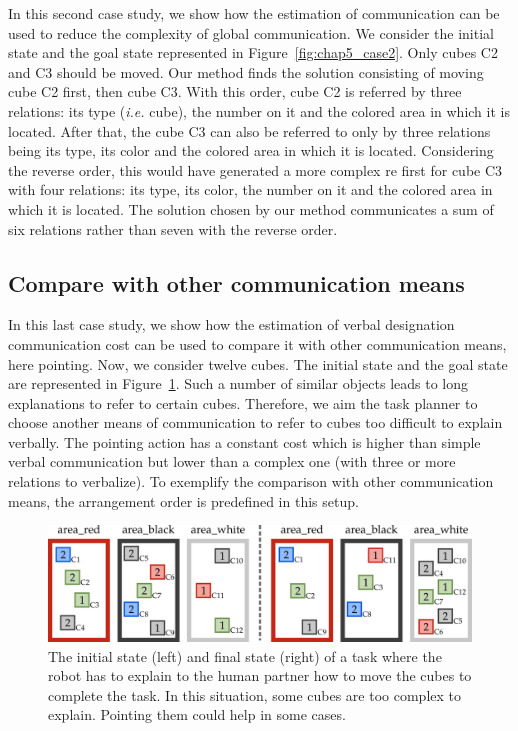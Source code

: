 In this second case study, we show how the estimation of communication can be used to reduce the complexity of global communication. We consider the initial state and the goal state represented in Figure~\ref{fig:chap5_case2}. Only cubes C2 and C3 should be moved. Our method finds the solution consisting of moving cube C2 first, then cube C3. With this order, cube C2 is referred by three relations: its type (\textit{i.e.} cube), the number on it and the colored area in which it is located. After that, the cube C3 can also be referred to only by three relations being its type, its color and the colored area in which it is located. Considering the reverse order, this would have generated a more complex \acrshort{re} first for cube C3 with four relations: its type, its color, the number on it and the colored area in which it is located.
The solution chosen by our method communicates a sum of six relations rather than seven with the reverse order.

\subsection{Compare with other communication means}

In this last case study, we show how the estimation of verbal designation communication cost can be used to compare it with other communication means, here pointing. Now, we consider twelve cubes. The initial state and the goal state are represented in Figure~\ref{fig:chap5_case3}. Such a number of similar objects leads to long explanations to refer to certain cubes. Therefore, we aim the task planner to choose another means of communication to refer to cubes too difficult to explain verbally. The pointing action has a constant cost which is higher than simple verbal communication but lower than a complex one (with three or more relations to verbalize). To exemplify the comparison with other communication means, the arrangement order is predefined in this setup.

\begin{figure}[!ht]
\centering
\includegraphics[width=\textwidth]{figures/chapter5/results_case3.png}
\caption{\label{fig:chap5_case3} The initial state (left) and final state (right) of a task where the robot has to explain to the human partner how to move the cubes to complete the task. In this situation, some cubes are too complex to explain. Pointing them could help in some cases. }
\end{figure}
 
